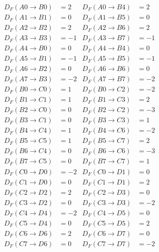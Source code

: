 \begin{align*}%
D_F(A0\to B0)&=2 &  D_F(A0\to B4)&=2\\
D_F(A1\to B1)&=0 &  D_F(A1\to B5)&=0\\
D_F(A2\to B2)&=2 &  D_F(A2\to B6)&=2\\
D_F(A3\to B3)&=-1& D_F(A3\to B7)&=-1\\
D_F(A4\to B0)&=0 &  D_F(A4\to B4)&=0\\
D_F(A5\to B1)&=-1& D_F(A5\to B5)&=-1\\
D_F(A6\to B2)&=0 &  D_F(A6\to B6)&=0\\
D_F(A7\to B3)&=-2& D_F(A7\to B7)&=-2\\
D_F(B0\to C0)&=1 &  D_F(B0\to C2)&=-2\\
D_F(B1\to C1)&=1 &  D_F(B1\to C3)&=2\\
D_F(B2\to C0)&=0 &  D_F(B2\to C2)&=-3\\
D_F(B3\to C1)&=0 &  D_F(B3\to C3)&=1\\
D_F(B4\to C4)&=1 &  D_F(B4\to C6)&=-2\\
D_F(B5\to C5)&=1 &  D_F(B5\to C7)&=2\\
D_F(B6\to C4)&=0 &  D_F(B6\to C6)&=-3\\
D_F(B7\to C5)&=0 &  D_F(B7\to C7)&=1\\
D_F(C0\to D0)&=-2& D_F(C0\to D1)&=0\\
D_F(C1\to D0)&=0 &  D_F(C1\to D1)&=2\\
D_F(C2\to D2)&=2 &  D_F(C2\to D3)&=0\\
D_F(C3\to D2)&=0 &  D_F(C3\to D3)&=-2\\
D_F(C4\to D4)&=-2&  D_F(C4\to D5)&=0\\
D_F(C5\to D4)&=0 &  D_F(C5\to D5)&=2\\
D_F(C6\to D6)&=2 &  D_F(C6\to D7)&=0\\
D_F(C7\to D6)&=0 &  D_F(C7\to D7)&=-2
\end{align*}